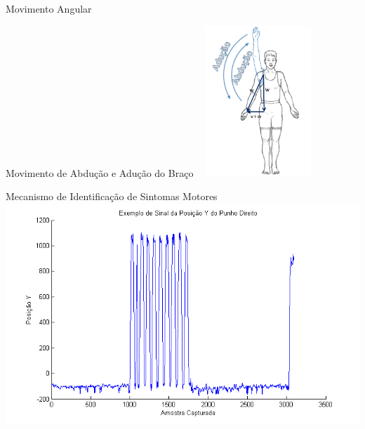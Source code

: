 \documentclass{beamer}
\begin{document}
\begin{frame}{Movimento Angular}
  \begin{block}{Movimento de Abdução e Adução do Braço ~\cite{mcginnis2013biomechanics}}
      \center \includegraphics[width=4cm]{img/abducao-angulo.png}
  \end{block}
\end{frame}

\begin{frame}{Mecanismo de Identificação de Sintomas Motores}
      \center \includegraphics[height=3 in]{img/exsinalposicaoypunhodireito.png}
\end{frame}
\end{document}
